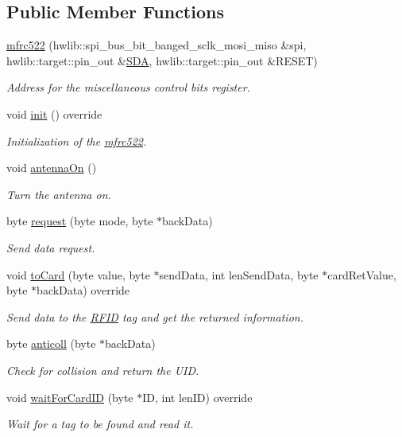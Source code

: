 \subsection*{Public Member Functions}
\begin{DoxyCompactItemize}
\item 
\hyperlink{classmfrc522_a7939e9c2b9c197a409489af7fe3c9da7}{mfrc522} (hwlib\+::spi\+\_\+bus\+\_\+bit\+\_\+banged\+\_\+sclk\+\_\+mosi\+\_\+miso \&spi, hwlib\+::target\+::pin\+\_\+out \&\hyperlink{class_r_f_i_d_a4367d5ca78409b651a56920886e8fac2}{S\+DA}, hwlib\+::target\+::pin\+\_\+out \&R\+E\+S\+ET)
\begin{DoxyCompactList}\small\item\em Address for the miscellaneous control bits register. \end{DoxyCompactList}\item 
void \hyperlink{classmfrc522_ac0a0cf7f16b98c37826ce0e160877269}{init} () override
\begin{DoxyCompactList}\small\item\em Initialization of the \hyperlink{classmfrc522}{mfrc522}. \end{DoxyCompactList}\item 
void \hyperlink{classmfrc522_a7b93914a7f2e1fd587392c2949f16ab1}{antenna\+On} ()
\begin{DoxyCompactList}\small\item\em Turn the antenna on. \end{DoxyCompactList}\item 
byte \hyperlink{classmfrc522_a0e19de4c39b37cf31d45af78f0fad524}{request} (byte mode, byte $\ast$back\+Data)
\begin{DoxyCompactList}\small\item\em Send data request. \end{DoxyCompactList}\item 
void \hyperlink{classmfrc522_a6801b8481392f6310b40a6893f6544c2}{to\+Card} (byte value, byte $\ast$send\+Data, int len\+Send\+Data, byte $\ast$card\+Ret\+Value, byte $\ast$back\+Data) override
\begin{DoxyCompactList}\small\item\em Send data to the \hyperlink{class_r_f_i_d}{R\+F\+ID} tag and get the returned information. \end{DoxyCompactList}\item 
byte \hyperlink{classmfrc522_a0ecbb86c1ad7fe15ea404f5bd8f30297}{anticoll} (byte $\ast$back\+Data)
\begin{DoxyCompactList}\small\item\em Check for collision and return the U\+ID. \end{DoxyCompactList}\item 
void \hyperlink{classmfrc522_a18665350caf822a716f2a72674a21647}{wait\+For\+Card\+ID} (byte $\ast$ID, int len\+ID) override
\begin{DoxyCompactList}\small\item\em Wait for a tag to be found and read it. \end{DoxyCompactList}\end{DoxyCompactItemize}
